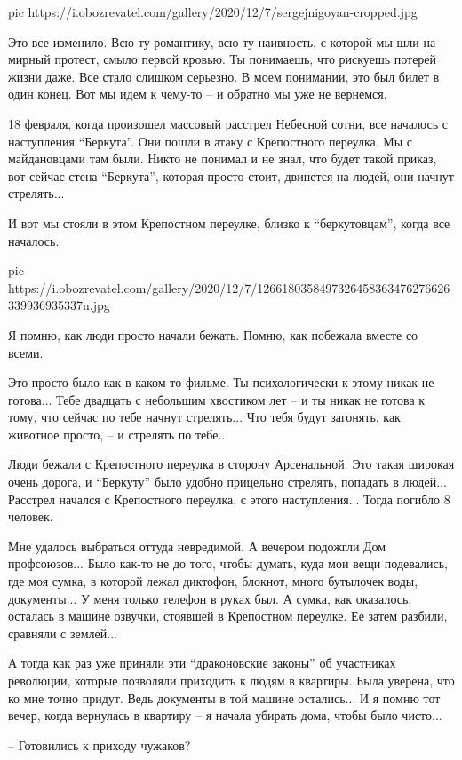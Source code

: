 \ifcmt
pic https://i.obozrevatel.com/gallery/2020/12/7/sergejnigoyan-cropped.jpg
\fi

Это все изменило. Всю ту романтику, всю ту наивность, с которой мы шли на
мирный протест, смыло первой кровью. Ты понимаешь, что рискуешь потерей жизни
даже. Все стало слишком серьезно. В моем понимании, это был билет в один конец.
Вот мы идем к чему-то – и обратно мы уже не вернемся.

18 февраля, когда произошел массовый расстрел Небесной сотни, все началось с
наступления \enquote{Беркута}. Они пошли в атаку с Крепостного переулка. Мы с
майдановцами там были. Никто не понимал и не знал, что будет такой приказ, вот
сейчас стена \enquote{Беркута}, которая просто стоит, двинется на людей, они начнут
стрелять...

И вот мы стояли в этом Крепостном переулке, близко к \enquote{беркутовцам}, когда все
началось.

\ifcmt
pic https://i.obozrevatel.com/gallery/2020/12/7/1266180358497326458363476276626339936935337n.jpg
\fi

Я помню, как люди просто начали бежать. Помню, как побежала вместе со всеми.

Это просто было как в каком-то фильме. Ты психологически к этому никак не
готова... Тебе двадцать с небольшим хвостиком лет – и ты никак не готова к
тому, что сейчас по тебе начнут стрелять... Что тебя будут загонять, как
животное просто, – и стрелять по тебе...

Люди бежали с Крепостного переулка в сторону Арсенальной. Это такая широкая
очень дорога, и \enquote{Беркуту} было удобно прицельно стрелять, попадать в людей...
Расстрел начался с Крепостного переулка, с этого наступления... Тогда погибло 8
человек.

Мне удалось выбраться оттуда невредимой. А вечером подожгли Дом профсоюзов...
Было как-то не до того, чтобы думать, куда мои вещи подевались, где моя сумка,
в которой лежал диктофон, блокнот, много бутылочек воды, документы... У меня
только телефон в руках был. А сумка, как оказалось, осталась в машине озвучки,
стоявшей в Крепостном переулке. Ее затем разбили, сравняли с землей...

А тогда как раз уже приняли эти \enquote{драконовские законы} об участниках революции,
которые позволяли приходить к людям в квартиры. Была уверена, что ко мне точно
придут. Ведь документы в той машине остались... И я помню тот вечер, когда
вернулась в квартиру – я начала убирать дома, чтобы было чисто...

– Готовились к приходу чужаков?

